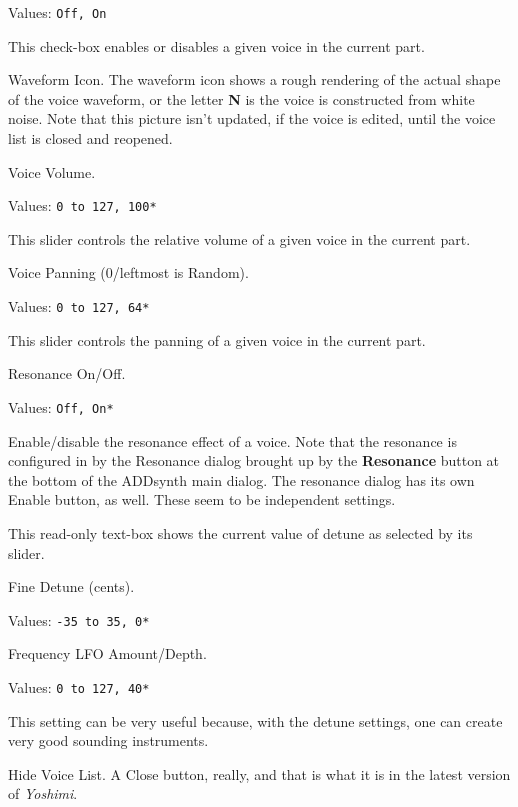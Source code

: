    Values: \texttt{Off, On}

   This check-box enables or disables a given voice in the current part.

   Waveform Icon.
   The waveform icon shows a rough rendering of the actual shape of the
   voice waveform, or the letter \textbf{N} is the voice is constructed from
   white noise.  Note that this picture isn't updated, if the voice is
   edited, until the voice list is closed and reopened.

   Voice Volume.

   Values: \texttt{0 to 127, 100*}

   This slider controls the relative volume of a given voice in the current
   part.

   Voice Panning (0/leftmost is Random).

   Values: \texttt{0 to 127, 64*}

   This slider controls the panning of a given voice in the current part.

   Resonance On/Off.

   Values: \texttt{Off, On*}

   Enable/disable the resonance effect of a voice.
   Note that the resonance is configured in by the Resonance dialog brought
   up by the \textbf{Resonance} button at the bottom of the ADDsynth main
   dialog.  The resonance dialog has its own Enable button, as well.
   These seem to be independent settings.

   This read-only text-box shows the current value of detune as selected by
   its slider.

   Fine Detune (cents).

   Values: \texttt{-35 to 35, 0*}

   Frequency LFO Amount/Depth.

   Values: \texttt{0 to 127, 40*}

   This setting can be very useful because, with the detune settings, one can
   create very good sounding instruments. 

   Hide Voice List.  A Close button, really, and that is what it is in the
   latest version of \textsl{Yoshimi}.

